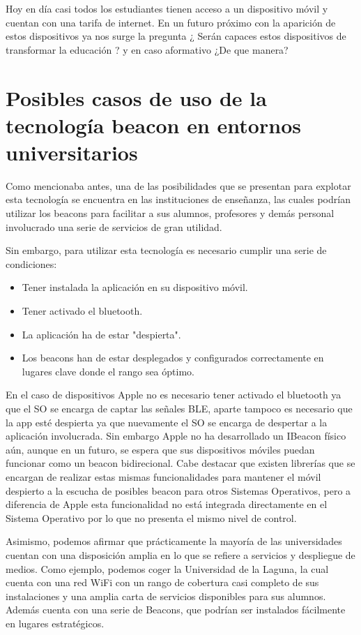  Hoy en día casi todos los estudiantes tienen acceso a un dispositivo móvil y cuentan con una tarifa de internet. En un futuro próximo con la aparición de estos dispositivos ya nos surge la pregunta ¿ Serán capaces estos dispositivos de transformar la educación ? y en caso aformativo ¿De que manera? 

\section {Posibles casos de uso de la tecnología beacon en entornos universitarios}

Como mencionaba antes, una de las posibilidades que se presentan para explotar esta tecnología se encuentra en las instituciones de enseñanza, las cuales podrían utilizar los beacons para facilitar a sus alumnos, profesores y demás personal involucrado  una serie de servicios de gran utilidad.

Sin embargo, para utilizar esta tecnología es necesario cumplir una serie de condiciones:

\begin{itemize}
\item Tener instalada la aplicación en su dispositivo móvil.
\item Tener activado el bluetooth.
\item La aplicación ha de estar "despierta".
\item Los beacons han de estar desplegados y configurados correctamente en lugares clave donde el rango sea óptimo.
\end{itemize}

En el caso de dispositivos Apple no es necesario tener activado el bluetooth ya que el SO se encarga de captar las señales BLE, aparte tampoco es necesario que la app esté despierta ya que nuevamente el SO se encarga de despertar a la aplicación involucrada. Sin embargo Apple no ha desarrollado un IBeacon físico aún, aunque en un futuro, se espera que sus dispositivos móviles puedan funcionar como un beacon bidirecional. Cabe destacar que existen librerías que se encargan de realizar estas mismas funcionalidades para mantener el móvil despierto a la escucha de posibles beacon para otros Sistemas Operativos, pero a diferencia de Apple esta funcionalidad no está integrada directamente en el Sistema Operativo por lo que no presenta el mismo nivel de control.

Asimismo, podemos afirmar que prácticamente la mayoría de las universidades cuentan con una disposición amplia en lo que se refiere a servicios y despliegue de medios. Como ejemplo, podemos coger la Universidad de la Laguna, la cual cuenta con una red WiFi con un rango de cobertura casi completo de sus instalaciones y una amplia carta de servicios disponibles para sus alumnos. Además cuenta con una serie de Beacons, que podrían ser instalados fácilmente en lugares estratégicos. 

